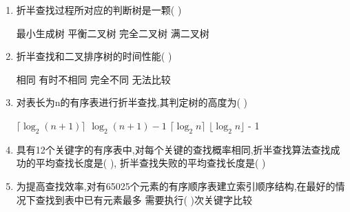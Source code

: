 \documentclass[12pt, a4paper, oneside, UTF8]{ctexbook}
\begin{document}
\begin{enumerate}
    \item 折半查找过程所对应的判断树是一颗(   ) 
    \begin{choices}
        \task 最小生成树
        \task 平衡二叉树
        \task 完全二叉树
        \task 满二叉树
    \end{choices}

    \item 折半查找和二叉排序树的时间性能(   ) 
    \begin{choices}
        \task 相同
        \task 有时不相同
        \task 完全不同
        \task 无法比较
    \end{choices}

    \item 对表长为n的有序表进行折半查找,其判定树的高度为(    ) 
    \begin{choices}
        \task $\lceil\log_{2}{(n+1)}\rceil$
        \task $\log_{2}{(n+1)}-1$
        \task $\lceil\log_{2}{n}\rceil$
        \task $\lfloor\log_2{n}\rfloor$ - 1
    \end{choices}
    
    \item 具有12个关键字的有序表中,对每个关键的查找概率相同,折半查找算法查找成功的平均查找长度是(   ),
    折半查找失败的平均查找长度是(    ) 

    \item 为提高查找效率,对有65025个元素的有序顺序表建立索引顺序结构,在最好的情况下查找到表中已有元素最多
    需要执行(   )次关键字比较 
    

\end{enumerate}
\end{document}
